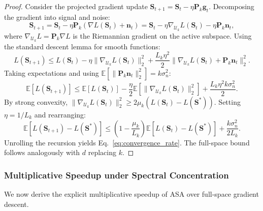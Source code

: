 \documentclass[preprint,12pt]{elsarticle}
\begin{document}
\begin{proof}
Consider the projected gradient update $\mathbf{S}_{t+1} = \mathbf{S}_t - \eta \mathbf{P}_k \mathbf{g}_t$. Decomposing the gradient into signal and noise:
\begin{equation}
\mathbf{S}_{t+1} = \mathbf{S}_t - \eta \mathbf{P}_k (\nabla L(\mathbf{S}_t) + \mathbf{n}_t) = \mathbf{S}_t - \eta \nabla_{\mathcal{U}_k} L(\mathbf{S}_t) - \eta \mathbf{P}_k \mathbf{n}_t,
\end{equation}
where $\nabla_{\mathcal{U}_k} L = \mathbf{P}_k \nabla L$ is the Riemannian gradient on the active subspace. Using the standard descent lemma for smooth functions:
\begin{equation}
L(\mathbf{S}_{t+1}) \leq L(\mathbf{S}_t) - \eta \|\nabla_{\mathcal{U}_k} L(\mathbf{S}_t)\|_2^2 + \frac{L_k \eta^2}{2} \|\nabla_{\mathcal{U}_k} L(\mathbf{S}_t) + \mathbf{P}_k \mathbf{n}_t\|_2^2.
\end{equation}
Taking expectations and using $\mathbb{E}[\|\mathbf{P}_k \mathbf{n}_t\|_2^2] = k \sigma_n^2$:
\begin{equation}
\mathbb{E}[L(\mathbf{S}_{t+1})] \leq \mathbb{E}[L(\mathbf{S}_t)] - \frac{\eta}{2} \mathbb{E}[\|\nabla_{\mathcal{U}_k} L(\mathbf{S}_t)\|_2^2] + \frac{L_k \eta^2 k \sigma_n^2}{2}.
\end{equation}
By strong convexity, $\|\nabla_{\mathcal{U}_k} L(\mathbf{S}_t)\|_2^2 \geq 2\mu_k (L(\mathbf{S}_t) - L(\mathbf{S}^*))$. Setting $\eta = 1/L_k$ and rearranging:
\begin{equation}
\mathbb{E}[L(\mathbf{S}_{t+1}) - L(\mathbf{S}^*)] \leq \left(1 - \frac{\mu_k}{L_k}\right) \mathbb{E}[L(\mathbf{S}_t) - L(\mathbf{S}^*)] + \frac{k \sigma_n^2}{2 L_k}.
\end{equation}
Unrolling the recursion yields Eq.~\eqref{eq:convergence_rate}. The full-space bound follows analogously with $d$ replacing $k$.
\end{proof}

\subsubsection{Multiplicative Speedup under Spectral Concentration}
\label{sec:speedup}

We now derive the explicit multiplicative speedup of ASA over full-space gradient descent.
\end{document}

